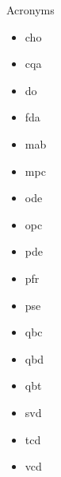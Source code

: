 \begin{frame}{Acronyms} 
\begin{multicols}{2}
\begin{itemize}
	\item \gls{cho}
	\item \gls{cqa}
	\item \gls{do}
	\item \gls{fda}
	\item \gls{mab}
	\item \gls{mpc}	
	\item \gls{ode}
	\item \gls{opc}	
	\item \gls{pde}
	\item \gls{pfr}
	\item \gls{pse}
	\item \gls{qbc}
	\item \gls{qbd}
	\item \gls{qbt}
	\item \gls{svd}
	\item \gls{tcd}
	\item \gls{vcd}
\end{itemize}
\end{multicols}
\end{frame}